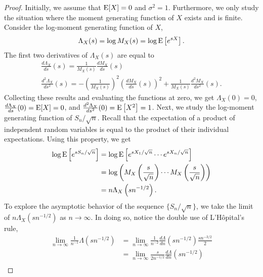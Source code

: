 \begin{proof}
Initially, we assume that $\mathrm{E} [X] = 0$ and $\sigma^2 = 1$.
Furthermore, we only study the situation where the moment generating function of $X$ exists and is finite.
Consider the log-moment generating function of $X$,
\begin{equation*}
\Lambda_X (s) = \log M_X (s)
= \log \mathrm{E} \left[ e^{sX} \right] .
\end{equation*}
The first two derivatives of $\Lambda_X (s)$ are equal to
\begin{gather*}
\frac{d \Lambda_X}{ds} (s)
= \frac{1}{M_X (s)} \frac{d M_X}{ds} (s) \\
\frac{d^2 \Lambda_X}{ds^2} (s)
= - \left( \frac{1}{M_X (s)} \right)^2 \left( \frac{d M_X}{ds} (s) \right)^2
+ \frac{1}{M_X (s)} \frac{d^2 M_X}{ds^2} (s) .
\end{gather*}
Collecting these results and evaluating the functions at zero, we get $\Lambda_X (0) = 0$, $\frac{d \Lambda_X}{ds} (0) = \mathrm{E} [X] = 0$, and $\frac{d^2 \Lambda_X}{ds^2} (0) = \mathrm{E} \left[ X^2 \right] = 1$.
Next, we study the log-moment generating function of $S_n / \sqrt{n}$.
Recall that the expectation of a product of independent random variables is equal to the product of their individual expectations.
Using this property, we get
\begin{equation*}
\begin{split}
\log \mathrm{E} \left[ e^{s S_n / \sqrt{n} } \right]
&= \log \mathrm{E} \left[ e^{s X_1 / \sqrt{n} }
\cdots e^{s X_n / \sqrt{n} } \right] \\
&= \log \left( M_X \left( \frac{s}{\sqrt{n}} \right)
\cdots M_X \left( \frac{s}{\sqrt{n}} \right) \right) \\
&= n \Lambda_X \left( s n^{-1/2} \right) .
\end{split}
\end{equation*}
To explore the asymptotic behavior of the sequence $\{ S_n / \sqrt{n} \}$, we take the limit of $n \Lambda_X \left( s n^{-1/2} \right)$ as $n \rightarrow \infty$.
In doing so, notice the double use of L'H\^{o}pital's rule,
\begin{equation*}
\begin{split}
\lim_{n \rightarrow \infty} \frac{1}{n^{-1}} \Lambda \left( s n^{-1/2} \right)
&= \lim_{n \rightarrow \infty} \frac{1}{n^{-2}}
\frac{d \Lambda}{dn} \left( s n^{-1/2} \right) \frac{s n^{-3/2}}{2} \\
&= \lim_{n \rightarrow \infty} \frac{s}{2 n^{-1/2}}
\frac{d \Lambda}{dn} \left( s n^{-1/2} \right) \\

\end{split}
\end{equation*}
\end{proof}
